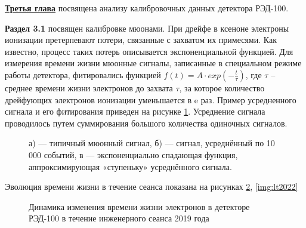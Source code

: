  \underline{\textbf{Третья глава}} посвящена анализу калибровочных данных детектора РЭД-100.  
 
 \textbf{Раздел 3.1} посвящен калибровке мюонами. При дрейфе в ксеноне электроны ионизации претерпевают потери, связанные с захватом их примесями. Как известно, процесс таких потерь описывается экспоненциальной функцией. Для измерения времени жизни мюонные сигналы, записанные в специальном режиме работы детектора, фитировались функцией $ f(t) = A\cdot exp(-\frac{t}{\tau})$, где $\tau$ -- среднее времени
жизни электронов до захвата $\tau$, за которое количество дрейфующих электронов ионизации уменьшается в e раз. Пример усредненного сигнала и его фитирования приведен на рисунке \ref{img:muonsignal}. Усреднение сигнала проводилось путем суммирования большого количества одиночных сигналов.
\begin{figure}[ht!]	
	\caption[Пример определения времени жизни электронов ионизации до захвата электроотрицательными примесями в жидком ксеноне.]{а) — типичный мюонный сигнал, б) — сигнал, усреднённый по 10 000 событий, в — экспоненциально спадающая функция, аппроксимирующая «ступеньку» усреднённого сигнала.}
	\label{img:muonsignal}
\end{figure}

Эволюция времени жизни в течение сеанса показана
на рисунках \ref{img:lt2019}, \ref{img:lt2022}

\begin{figure}[ht!]	
	\caption{Динамика изменения времени жизни электронов в детекторе РЭД-100 в течение инженерного сеанса 2019 года}
	\label{img:lt2019}
\end{figure}

